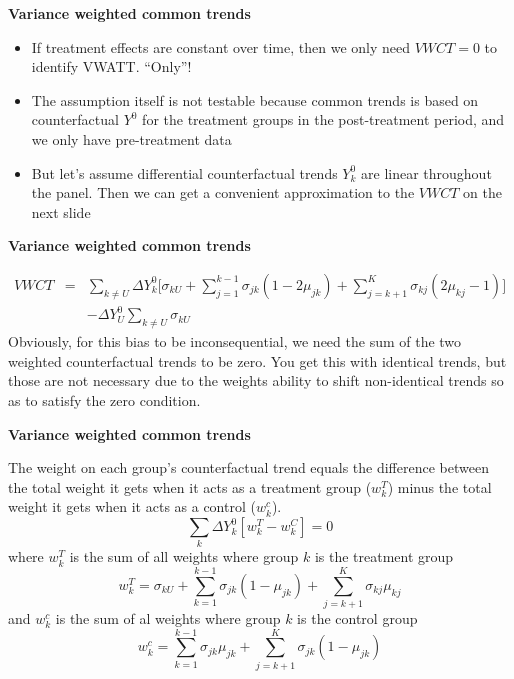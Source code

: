 \documentclass[notes=show]{beamer}
\begin{document}
\begin{frame}[plain]
\begin{center}
\textbf{Variance weighted common trends}
\end{center}

\begin{itemize}
\item If treatment effects are constant over time, then we only need $VWCT=0$ to identify VWATT.  ``Only''!
\item The assumption itself is not testable because common trends is based on counterfactual $Y^0$ for the treatment groups in the post-treatment period, and we only have pre-treatment data
\item But let's assume differential counterfactual trends $Y^0_k$ are linear throughout the panel. Then we can get a convenient approximation to the $VWCT$ on the next slide
\end{itemize}

\end{frame}

\begin{frame}[plain]
\begin{center}
\textbf{Variance weighted common trends}
\end{center}

\begin{eqnarray*}
VWCT &=& \sum_{k \neq U} \Delta Y^0_k \bigg [ \sigma_{kU} + \sum_{j=1}^{k-1} \sigma_{jk} (1-2\mu_{jk}) + \sum_{j=k+1}^K \sigma_{kj} (2 \mu_{kj} - 1 ) \bigg ] \\
&& - \Delta Y^0_U \sum_{k \neq U} \sigma_{kU}
\end{eqnarray*}Obviously, for this bias to be inconsequential, we need the sum of the two weighted counterfactual trends to be zero. You get this with identical trends, but those are not necessary due to the weights ability to shift non-identical trends so as to satisfy the zero condition.

\end{frame}


\begin{frame}[plain]
\begin{center}
\textbf{Variance weighted common trends}
\end{center}

The weight on each group's counterfactual trend equals the difference between the total weight it gets when it acts as a treatment group ($w_k^T$) minus the total weight it gets when it acts as a control ($w_k^c$). 
$$ \sum_k \Delta Y^0_k [ w_k^T - w_k^C] = 0 $$
where $w_k^T$ is the sum of all weights where group $k$ is the treatment group $$w_k^T = \sigma_{kU} + \sum_{k=1}^{k-1} \sigma_{jk}(1-\mu_{jk}) + \sum_{j=k+1}^K \sigma_{kj}\mu_{kj}$$and $w_k^c$ is the sum of al weights where group $k$ is the control group $$w_k^c = \sum_{k=1}^{k-1} \sigma_{jk}\mu_{jk} + \sum_{j=k+1}^K \sigma_{jk}(1-\mu_{jk})$$

\end{frame}
\end{document}
